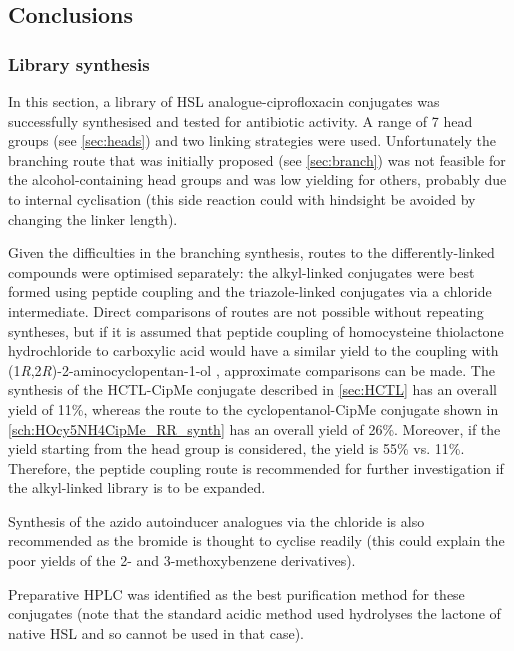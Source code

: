 \subsection{Conclusions}

\subsubsection{Library synthesis}

In this section, a library of HSL analogue-ciprofloxacin conjugates was successfully synthesised and tested for antibiotic activity.
A range of 7 head groups (see \ref{sec:heads}) and two linking strategies were used.
Unfortunately the branching route that was initially proposed (see \ref{sec:branch}) was not feasible for the alcohol-containing head groups and was low yielding for others, probably due to internal cyclisation (this side reaction could with hindsight be avoided by changing the linker length).

Given the difficulties in the branching synthesis, routes to the differently-linked compounds were optimised separately: the alkyl-linked conjugates were best formed using peptide coupling and the triazole-linked conjugates via a chloride intermediate. 
Direct comparisons of routes are not possible without repeating syntheses, but if it is assumed that peptide coupling of homocysteine thiolactone hydrochloride  to carboxylic acid  would have a similar yield to the coupling with (1\textit{R},2\textit{R})-2-aminocyclopentan-1-ol , approximate comparisons can be made.
The synthesis of the HCTL-CipMe conjugate  described in \ref{sec:HCTL} has an overall yield of 11\%, whereas the route to the cyclopentanol-CipMe conjugate  shown in \ref{sch:HOcy5NH4CipMe_RR_synth} has an overall yield of 26\%. Moreover, if the yield starting from the head group is considered, the yield is 55\% vs. 11\%.
Therefore, the peptide coupling route is recommended for further investigation if the alkyl-linked library is to be expanded.

Synthesis of the azido autoinducer analogues via the chloride is also recommended as the bromide is thought to cyclise readily (this could explain the poor yields of the 2- and 3-methoxybenzene derivatives).

Preparative HPLC was identified as the best purification method for these conjugates (note that the standard acidic method used hydrolyses the lactone of native HSL and so cannot be used in that case).


